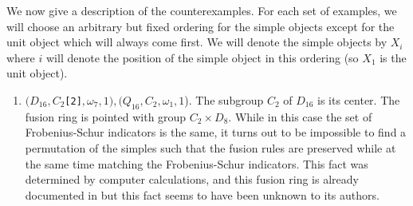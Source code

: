 \documentclass[a4paper, 10pt]{book}
\theoremstyle{definition}
\numberwithin{equation}{chapter}
\newcommand\lstl{\lstinline}
\begin{document}
We now give a description of the counterexamples. For each set of examples, we will choose an arbitrary but fixed ordering for the simple objects except for the unit object which will always come first. We will denote the simple objects by $X_i$ where $i$ will denote the position of the simple object in this ordering (so $X_1$ is the unit object). \\
\begin{enumerate}
	\item \label{ex3} $(D_{16}, C_2 $\lstl{[2]}$, \omega_7, 1), (Q_{16}, C_2, \omega_1, 1$). The subgroup $C_2$ of $D_{16}$ is its center.  The fusion ring is pointed with group $C_2\times D_8$. While in this case the set of Frobenius-Schur indicators is the same, it turns out to be impossible to find a permutation of the simples such that the fusion rules are preserved while at the same time matching the Frobenius-Schur indicators. This fact was determined by computer calculations, and this fusion ring is already documented in \cite{2017arXiv170806538M} but this fact seems to have been unknown to its authors.


\end{enumerate}
\end{document}
